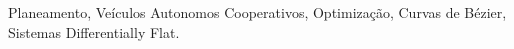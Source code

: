 \noindent Planeamento, Veículos Autonomos Cooperativos, Optimização, Curvas de Bézier, Sistemas Differentially Flat.
